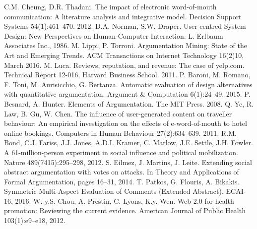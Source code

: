 \documentclass[runningheads,a4paper]{llncs}
\begin{document}
\begin{thebibliography}{4}

 C.M. Cheung, D.R. Thadani. The impact of electronic word-of-mouth communication: A literature analysis and integrative model. Decision Support Systems 54(1):461--470. 2012.
 D.A. Norman, S.W. Draper. User-centred System Design: New Perspectives on Human-Computer Interaction. L. Erlbaum Associates Inc., 1986.
 M. Lippi, P. Torroni. Argumentation Mining: State of the Art and Emerging Trends. ACM Transactions on Internet Technology 16(2)10, March 2016. 
 M. Luca. Reviews, reputation, and revenue: The case of yelp.com. Technical Report 12-016, Harvard Business School. 2011.
 P. Baroni,  M. Romano,  F.  Toni,  M.  Aurisicchio,  G. Bertanza. Automatic evaluation of design alternatives with quantitative argumentation. Argument \& Computation 6(1):24--49, 2015.
 P. Besnard, A. Hunter. Elements of Argumentation. The MIT Press. 2008.
 Q. Ye, R. Law, B. Gu, W. Chen. The influence of user-generated content on traveller behaviour: An empirical investigation on the effects of e-word-of-mouth to hotel online bookings. Computers in Human Behaviour 27(2):634--639. 2011.
 R.M. Bond, C.J. Fariss, J.J. Jones, A.D.I. Kramer, C. Marlow, J.E. Settle, J.H. Fowler. A 61-million-person experiment in social influence and political mobilization. Nature 489(7415):295--298, 2012.
 S. Eilmez, J. Martins, J. Leite. Extending social abstract argumentation with votes on attacks. In Theory and Applications of Formal Argumentation, pages 16--31, 2014.
 T. Patkos, G. Flouris, A. Bikakis. Symmetric Multi-Aspect Evaluation of Comments (Extended Abstract). ECAI-16, 2016.
 W.-y.S. Chou, A. Prestin, C. Lyons, K.y. Wen. Web 2.0 for health promotion: Reviewing the current evidence. American Journal of Public Health 103(1):e9--e18, 2012. 

\end{thebibliography}
\end{document}
